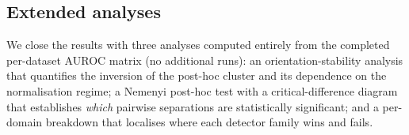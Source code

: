 
\subsection{Extended analyses}\label{sec:results-extended}
We close the results with three analyses computed entirely from the completed
per-dataset AUROC matrix (no additional runs): an orientation-stability analysis
that quantifies the inversion of the post-hoc cluster and its dependence on the
normalisation regime; a Nemenyi post-hoc test with a critical-difference diagram
that establishes \emph{which} pairwise separations are statistically significant;
and a per-domain breakdown that localises where each detector family wins and
fails.

